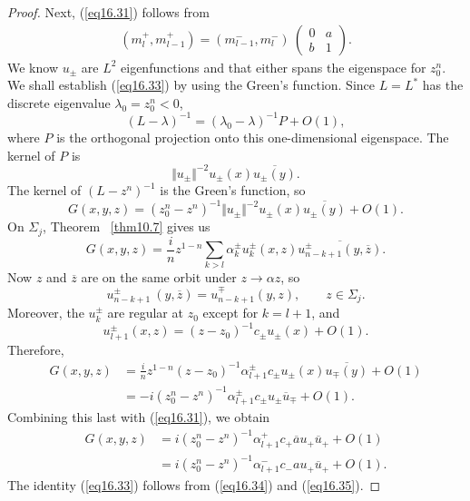 \documentclass{surv-l}
\theoremstyle{plain}
\theoremstyle{definition}
\numberwithin{equation}{chapter}
\begin{document}
\begin{proof}
Next, (\ref{eq16.31}) follows from
\begin{align*}
(m_{l}^{+},m_{l-1}^{+})=(m_{l-1}^{-}, m_{l}^{-})\ \left(\begin{array}{ll}
0 & a\\
b & 1
\end{array}\right).
\end{align*}
We know $u_{\pm}$ are $L^{2}$ eigenfunctions and that either spans the eigenspace for $z_{0}^{n}$. We shall establish (\ref{eq16.33}) by using the Green's  function. Since $L=L^{*}$ has the discrete eigenvalue $\lambda_{0}=z_{0}^{n}<0$,
\begin{equation*}
(L-\lambda)^{-1}=(\lambda_{0}-\lambda)^{-1}P+O(1),
\end{equation*}
where $P$ is the orthogonal projection onto this one-dimensional eigenspace. The kernel of $P$ is
\begin{equation*}
\Vert u_{\pm}\Vert^{-2}u_{\pm}(x)\overline{u_{\pm}(y)}.
\end{equation*}
The kernel of $(L-z^{n})^{-1}$ is the Green's function, so
\begin{equation}\label{eq16.34}
G(x, y, z)=(z_{0}^{n}-z^{n})^{-1}\Vert u_{\pm}\Vert^{-2}u_{\pm}(x)\overline{u_{\pm}(y)}+O(1).
\end{equation}
On $\Sigma_{j}$, Theorem ~\ref{thm10.7} gives us
\begin{equation*}
G(x,y, z)=\frac{i}{n}z^{1-n}\sum_{k>l}\alpha_{k}^{\pm}u_{k}^{\pm}(x, z)\overline{u_{n-k+1}^{\pm}(y,\overline{z})}.
\end{equation*}
Now $z$ and $\overline{z}$ are on the same orbit under $z\rightarrow\alpha z$, so
\begin{equation*}
u_{n-k+1}^{\pm}\ (y,\overline{z})=u_{n-k+1}^{\mp}(y,z),\qquad z\in\Sigma_{j}.
\end{equation*}
Moreover, the $u_{k}^{\pm}$ are regular at $z_{0}$ except for $k=l+1$, and
\begin{equation*}
u_{l+1}^{\pm}(x,z)=(z-z_{0})^{-1}c_{\pm} u_{\pm}(x)+O(1).
\end{equation*}
Therefore,
\begin{align*}
G(x,y, z)&=\frac{i}{n}z^{1-n}(z-z_{0})^{-1}\alpha_{l+1}^{\pm}c_{\pm} u_{\pm}(x)\overline{u_{\mp}(y)}+O(1)\\
&=-i(z_{0}^{n}-z^{n})^{-1}\alpha_{l+1}^{\pm}c_{\pm} u_{\pm}\overline{u}_{\mp}+O(1).
\end{align*}
Combining this last with (\ref{eq16.31}), we obtain
\begin{align}\label{eq16.35}
G(x,y, z)&=i(z_{0}^{n}-z^{n})^{-1}\alpha_{l+1}^{+}c_{+}\overline{a}u_{+}\overline{u}_{+}+O(1)\nonumber\\
&=i(z_{0}^{n}-z^{n})^{-1}\alpha_{l+1}^{-}c_{-}au_{+}\overline{u}_{+}+O(1).
\end{align}
The identity (\ref{eq16.33}) follows from (\ref{eq16.34}) and (\ref{eq16.35}).
\end{proof}
\end{document}
